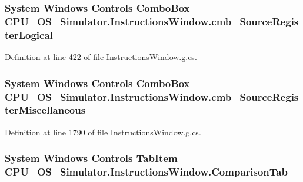 \subsubsection[{cmb\+\_\+\+Source\+Register\+Logical}]{\setlength{\rightskip}{0pt plus 5cm}System Windows Controls Combo\+Box C\+P\+U\+\_\+\+O\+S\+\_\+\+Simulator.\+Instructions\+Window.\+cmb\+\_\+\+Source\+Register\+Logical\hspace{0.3cm}{\ttfamily [package]}}\label{class_c_p_u___o_s___simulator_1_1_instructions_window_a46a9647a5a6e661afb789b1faa95a15a}


Definition at line 422 of file Instructions\+Window.\+g.\+cs.

\hypertarget{class_c_p_u___o_s___simulator_1_1_instructions_window_a98245ef6ca4796b7f59fe4b9937a388e}{}
\subsubsection[{cmb\+\_\+\+Source\+Register\+Miscellaneous}]{\setlength{\rightskip}{0pt plus 5cm}System Windows Controls Combo\+Box C\+P\+U\+\_\+\+O\+S\+\_\+\+Simulator.\+Instructions\+Window.\+cmb\+\_\+\+Source\+Register\+Miscellaneous\hspace{0.3cm}{\ttfamily [package]}}\label{class_c_p_u___o_s___simulator_1_1_instructions_window_a98245ef6ca4796b7f59fe4b9937a388e}


Definition at line 1790 of file Instructions\+Window.\+g.\+cs.

\hypertarget{class_c_p_u___o_s___simulator_1_1_instructions_window_ab807abcf9c3955ae2ff78e1d667820b2}{}
\subsubsection[{Comparison\+Tab}]{\setlength{\rightskip}{0pt plus 5cm}System Windows Controls Tab\+Item C\+P\+U\+\_\+\+O\+S\+\_\+\+Simulator.\+Instructions\+Window.\+Comparison\+Tab\hspace{0.3cm}{\ttfamily [package]}}\label{class_c_p_u___o_s___simulator_1_1_instructions_window_ab807abcf9c3955ae2ff78e1d667820b2}



